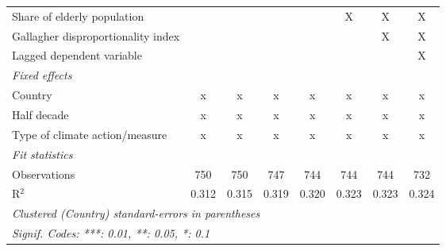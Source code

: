 \begin{tabular}{lccccccc}
   Share of elderly population                                      &              &               &               &               & X             & X             & X\\  
   Gallagher disproportionality index                               &              &               &               &               &               & X             & X\\  
   Lagged dependent variable                                        &              &               &               &               &               &               & X\\  
   \emph{Fixed effects}\\
   Country                                                          & x            & x             & x             & x             & x             & x             & x\\  
   Half decade                                                      & x            & x             & x             & x             & x             & x             & x\\  
   Type of climate action/measure                                   & x            & x             & x             & x             & x             & x             & x\\  
   \midrule \emph{Fit statistics}\\
   Observations                                                     & 750          & 750           & 747           & 744           & 744           & 744           & 732\\  
   R$^2$                                                            & 0.312        & 0.315         & 0.319         & 0.320         & 0.323         & 0.323         & 0.324\\  
   \midrule
   \multicolumn{8}{l}{\emph{Clustered (Country) standard-errors in parentheses}}\\
   \multicolumn{8}{l}{\emph{Signif. Codes: ***: 0.01, **: 0.05, *: 0.1}}\\
\end{tabular}
\par\endgroup


